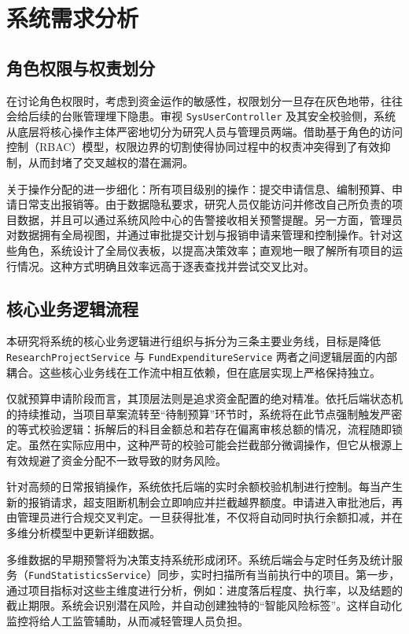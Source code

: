 \chapter{系统需求分析}

\section{角色权限与权责划分}
在讨论角色权限时，考虑到资金运作的敏感性，权限划分一旦存在灰色地带，往往会给后续的台账管理埋下隐患。审视 \texttt{SysUser\allowbreak Controller} 及其安全校验侧，系统从底层将核心操作主体严密地切分为研究人员与管理员两端。借助基于角色的访问控制（RBAC）模型，权限边界的切割使得协同过程中的权责冲突得到了有效抑制，从而封堵了交叉越权的潜在漏洞。

关于操作分配的进一步细化：所有项目级别的操作：提交申请信息、编制预算、申请日常支出报销等。由于数据隐私要求，研究人员仅能访问并修改自己所负责的项目数据，并且可以通过系统风险中心的告警接收相关预警提醒。另一方面，管理员对数据拥有全局视图，并通过审批提交计划与报销申请来管理和控制操作。针对这些角色，系统设计了全局仪表板，以提高决策效率；直观地一眼了解所有项目的运行情况。这种方式明确且效率远高于逐表查找并尝试交叉比对。

\section{核心业务逻辑流程}
本研究将系统的核心业务逻辑进行组织与拆分为三条主要业务线，目标是降低 \texttt{ResearchProject\allowbreak Service} 与 \texttt{FundExpenditure\allowbreak Service} 两者之间逻辑层面的内部耦合。这些核心业务线在工作流中相互依赖，但在底层实现上严格保持独立。

仅就预算申请阶段而言，其顶层法则是追求资金配置的绝对精准。依托后端状态机的持续推动，当项目草案流转至“待制预算”环节时，系统将在此节点强制触发严密的等式校验逻辑：拆解后的科目金额总和若存在偏离审核总额的情况，流程随即锁定。虽然在实际应用中，这种严苛的校验可能会拦截部分微调操作，但它从根源上有效规避了资金分配不一致导致的财务风险。

针对高频的日常报销操作，系统依托后端的实时余额校验机制进行控制。每当产生新的报销请求，超支阻断机制会立即响应并拦截越界额度。申请进入审批池后，再由管理员进行合规交叉判定。一旦获得批准，不仅将自动同时执行余额扣减，并在多维分析模型中更新详细数据。

多维数据的早期预警将为决策支持系统形成闭环。系统后端会与定时任务及统计服务（\texttt{FundStatistics\allowbreak Service}）同步，实时扫描所有当前执行中的项目。第一步，通过项目指标对这些主维度进行分析，例如：进度落后程度、执行率，以及结题的截止期限。系统会识别潜在风险，并自动创建独特的“智能风险标签”。这样自动化监控将给人工监管辅助，从而减轻管理人员负担\cite{Gaftandzhieva2023}。

